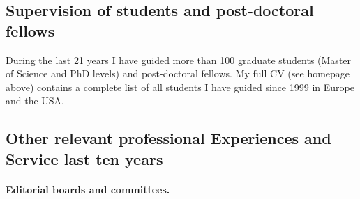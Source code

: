 \documentclass[11pt]{revtex4-1}
\begin{document}
\subsection*{Supervision of students and post-doctoral fellows}
During the last 21 years I have guided more than
100 graduate students (Master of Science and PhD levels) and post-doctoral
fellows. My full CV (see homepage above) contains a complete list of all students I have guided since 1999 in Europe and the USA.

\subsection*{Other relevant professional Experiences and Service last ten years}
\paragraph*{Editorial boards and committees.}
\end{document}
